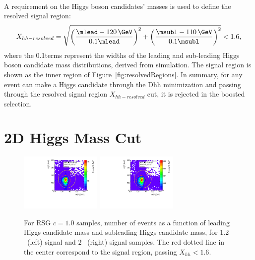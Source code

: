 \paragraph{}
A requirement on the Higgs boson candidates' masses is used to define the resolved signal region:
\begin{equation}
X_{hh-resolved} = \sqrt{\left(\frac{\mlead - 120\,\GeV}{0.1\mlead}\right)^2 + \left(\frac{\msubl - 110\,\GeV}{0.1\msubl}\right)^2} < 1.6,
\label{eqn:resolvedXhh}
\end{equation}
where the 0.1\mtwoj terms represent the widths of the leading and sub-leading Higgs boson candidate mass distributions, derived from simulation. The signal region is shown as the inner region of Figure~\ref{fig:resolvedRegions}. In summary, for any event can make a Higgs candidate through the Dhh minimization and passing through the resolved signal region $X_{hh-resolved}$ cut, it is rejected in the boosted selection.



\section{2D Higgs Mass Cut}

\begin{figure}[htbp!]
\begin{center}
\includegraphics[width=0.35\textwidth,angle=-90]{figures/boosted/Truth/Sig_1200_AllTag_Incl_mH0H1.pdf}
\includegraphics[width=0.35\textwidth,angle=-90]{figures/boosted/Truth/Sig_2000_AllTag_Incl_mH0H1.pdf}
\caption{For RSG $c=1.0$ samples, number of events as a function of leading Higgs candidate mass and subleading Higgs candidate mass, for $1.2$ \TeV~(left) signal and $2$ \TeV~(right) signal samples. The red dotted line in the center correspond to the signal region, passing $X_{hh} < 1.6$.}
\label{fig:evt-signal-mhh}
\end{center}
\end{figure}

